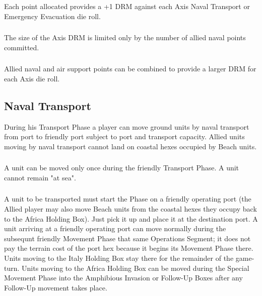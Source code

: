 \subsubsection{} Each point allocated provides a +1 DRM against each Axis Naval Transport or Emergency Evacuation die roll.

\subsubsection{} The size of the Axis DRM is limited only by the number of allied naval points committed.

\subsubsection{} Allied naval and air support points can be combined to provide a larger DRM for each Axis die roll.

\subsection{Naval Transport}

During his Transport Phase a player can move ground units by naval transport from port to friendly port subject to port and transport capacity. Allied units moving by naval transport cannot land on coastal hexes occupied by Beach units.

\subsubsection{} A unit can be moved only once during the friendly Transport Phase. A unit cannot remain "at sea".

\subsubsection{} A unit to be transported must start the Phase on a friendly operating port (the Allied player may also move Beach units from the coastal hexes they occupy back to the Africa Holding Box). Just pick it up and place it at the destination port. A unit arriving at a friendly operating port can move normally during the subsequnt friendly Movement Phase that same Operations Segment; it does not pay the terrain cost of the port hex because it begins its Movement Phase there. Units moving to the Italy Holding Box stay there for the remainder of the game-turn. Units moving to the Africa Holding Box can be moved during the Special Movement Phase into the Amphibious Invasion or Follow-Up Boxes after any Follow-Up movement takes place.

